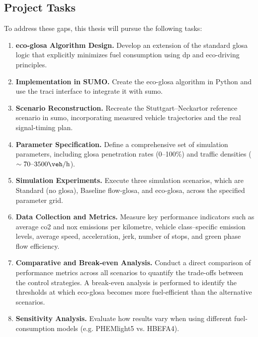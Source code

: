 \subsection{Project Tasks}
\label{subsec:Project_Tasks}
To address these gaps, this thesis will pursue the following tasks:
\begin{enumerate}
    \item \textbf{\ac{eco-glosa} Algorithm Design.} Develop an extension of the standard \ac{glosa} logic that explicitly minimizes fuel consumption using \ac{dp} and eco-driving principles.
    \item \textbf{Implementation in SUMO.} Create the \ac{eco-glosa} algorithm in Python and use the \ac{traci} interface to integrate it with \ac{sumo}.
    \item \textbf{Scenario Reconstruction.} Recreate the Stuttgart–Neckartor reference scenario in \ac{sumo}, incorporating measured vehicle trajectories and the real signal-timing plan.
    \item \textbf{Parameter Specification.} Define a comprehensive set of simulation parameters, including \ac{glosa} penetration rates (0–100\%) and traffic densities ($\sim 70\text{--}3500\unit{\veh\per\hour}$).
    \item \textbf{Simulation Experiments.} Execute three simulation scenarios, which are Standard (no \ac{glosa}), Baseline \ac{flow-glosa}, and \ac{eco-glosa}, across the specified parameter grid.
    \item \textbf{Data Collection and Metrics.} Measure key performance indicators such as average \ac{co2} and \ac{nox} emissions per kilometre, vehicle class–specific emission levels, average speed, acceleration, jerk, number of stops, and green phase flow efficiency.
    \item \textbf{Comparative and Break-even Analysis.} Conduct a direct comparison of performance metrics across all scenarios to quantify the trade-offs between the control strategies. A break-even analysis is performed to identify the thresholds at which \ac{eco-glosa} becomes more fuel-efficient than the alternative scenarios.
    \item \textbf{Sensitivity Analysis.}  Evaluate how results vary when using different fuel‐consumption models (e.g. PHEMlight5 vs. HBEFA4).
\end{enumerate}
